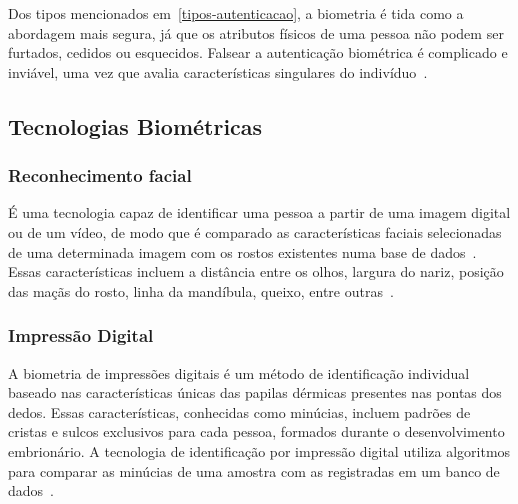 Dos tipos mencionados em~\ref{tipos-autenticacao}, a biometria é tida como a abordagem mais segura, já que os atributos físicos de uma pessoa não podem ser furtados, cedidos ou esquecidos.
Falsear a autenticação biométrica é complicado e inviável, uma vez que avalia características singulares do indivíduo~\cite{dos2019tecnologias}.

\subsection{Tecnologias Biométricas}\label{subsec:biometria-tecnologias}

\subsubsection{Reconhecimento facial}\label{subsubsec:reconhecimento-facial}
É uma tecnologia capaz de identificar uma pessoa a partir de uma imagem digital ou de um vídeo, de modo que é comparado as características faciais selecionadas de uma determinada imagem com os rostos existentes numa base de dados~\cite{orvalho2019reconhecimento}.
Essas características incluem a distância entre os olhos, largura do nariz, posição das maçãs do rosto, linha da mandíbula, queixo, entre outras~\cite{adeoye2010survey}.
%

%

\subsubsection{Impressão Digital}\label{subsubsec:geometria-mao}
A biometria de impressões digitais é um método de identificação individual baseado nas características únicas das papilas dérmicas presentes nas pontas dos dedos.
Essas características, conhecidas como minúcias, incluem padrões de cristas e sulcos exclusivos para cada pessoa, formados durante o desenvolvimento embrionário.
A tecnologia de identificação por impressão digital utiliza algoritmos para comparar as minúcias de uma amostra com as registradas em um banco de dados~\cite{de2020biometria}.

